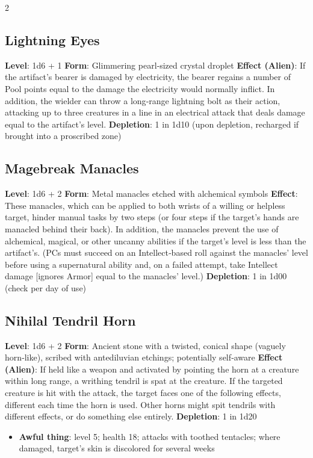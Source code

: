 \begin{multicols}{2}
\subsection{Lightning Eyes}
\textbf{Level}: 1d6 + 1 
\textbf{Form}: Glimmering pearl‑sized crystal droplet 
\textbf{Effect (Alien)}: If the artifact’s bearer is damaged by electricity, the bearer regains a number of Pool points equal to the damage the electricity would normally inflict. 
In addition, the wielder can throw a long‑range lightning bolt as their action, attacking up to three creatures in a line in an electrical attack that deals damage equal to the artifact’s level. 
\textbf{Depletion}: 1 in 1d10 (upon depletion, recharged if brought into a proscribed zone) 

\subsection{Magebreak Manacles }
\textbf{Level}: 1d6 + 2 
\textbf{Form}: Metal manacles etched with alchemical symbols 
\textbf{Effect}: These manacles, which can be applied to both wrists of a willing or helpless target, hinder manual tasks by two steps (or four steps if the target’s hands are manacled behind their back). In addition, the manacles prevent the use of alchemical, magical, or other uncanny abilities if the target’s level is less than the artifact’s. (PCs must succeed on an Intellect‑based roll against the manacles’ level before using a supernatural ability and, on a failed attempt, take Intellect damage [ignores Armor] equal to the manacles’ level.) 
\textbf{Depletion}: 1 in 1d00 (check per day of use) 

\subsection{Nihilal Tendril Horn}
\textbf{Level}: 1d6 + 2 
\textbf{Form}: Ancient stone with a twisted, conical shape (vaguely horn‑like), scribed with antediluvian etchings; potentially self‑aware 
\textbf{Effect (Alien)}: If held like a weapon and activated by pointing the horn at a creature within long range, a writhing tendril is spat at the creature. If the targeted creature is hit with the attack, the target faces one of the following effects, different each time the horn is used. Other horns might spit tendrils with different effects, or do something else entirely.
\textbf{Depletion}: 1 in 1d20

\begin{itemize} 
\item \textbf{Awful thing}: level 5; health 18; attacks with toothed tentacles; where damaged, target’s skin is discolored for several weeks
\end{itemize}


\end{multicols}
